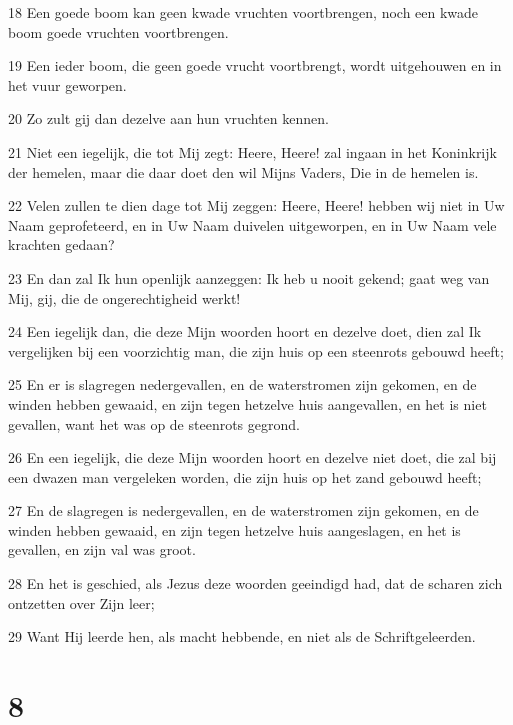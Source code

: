 \par 18 Een goede boom kan geen kwade vruchten voortbrengen, noch een kwade boom goede vruchten voortbrengen.
\par 19 Een ieder boom, die geen goede vrucht voortbrengt, wordt uitgehouwen en in het vuur geworpen.
\par 20 Zo zult gij dan dezelve aan hun vruchten kennen.
\par 21 Niet een iegelijk, die tot Mij zegt: Heere, Heere! zal ingaan in het Koninkrijk der hemelen, maar die daar doet den wil Mijns Vaders, Die in de hemelen is.
\par 22 Velen zullen te dien dage tot Mij zeggen: Heere, Heere! hebben wij niet in Uw Naam geprofeteerd, en in Uw Naam duivelen uitgeworpen, en in Uw Naam vele krachten gedaan?
\par 23 En dan zal Ik hun openlijk aanzeggen: Ik heb u nooit gekend; gaat weg van Mij, gij, die de ongerechtigheid werkt!
\par 24 Een iegelijk dan, die deze Mijn woorden hoort en dezelve doet, dien zal Ik vergelijken bij een voorzichtig man, die zijn huis op een steenrots gebouwd heeft;
\par 25 En er is slagregen nedergevallen, en de waterstromen zijn gekomen, en de winden hebben gewaaid, en zijn tegen hetzelve huis aangevallen, en het is niet gevallen, want het was op de steenrots gegrond.
\par 26 En een iegelijk, die deze Mijn woorden hoort en dezelve niet doet, die zal bij een dwazen man vergeleken worden, die zijn huis op het zand gebouwd heeft;
\par 27 En de slagregen is nedergevallen, en de waterstromen zijn gekomen, en de winden hebben gewaaid, en zijn tegen hetzelve huis aangeslagen, en het is gevallen, en zijn val was groot.
\par 28 En het is geschied, als Jezus deze woorden geeindigd had, dat de scharen zich ontzetten over Zijn leer;
\par 29 Want Hij leerde hen, als macht hebbende, en niet als de Schriftgeleerden.

\chapter{8}

